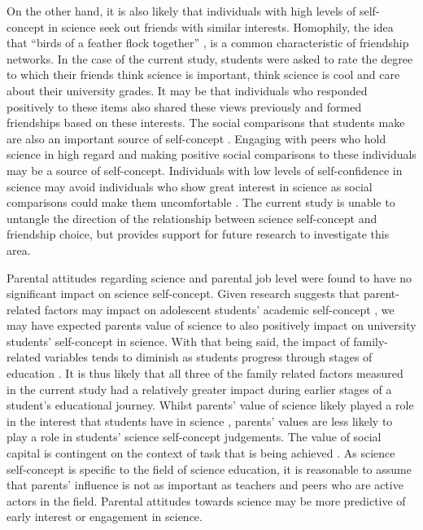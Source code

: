 On the other hand, it is also likely that individuals with high levels of self-concept in science seek out friends with similar interests. Homophily, the idea that ``birds of a feather flock together'' \cite{mcpherson2001birds}, is a common characteristic of friendship networks. In the case of the current study, students were asked to rate the degree to which their friends think science is important, think science is cool and care about their university grades. It may be that individuals who responded positively to these items also shared these views previously and formed friendships based on these interests. The social comparisons that students make are also an important source of self-concept \cite{butz2015salient}. Engaging with peers who hold science in high regard and making positive social comparisons to these individuals may be a source of self-concept. Individuals with low levels of self-confidence in science may avoid individuals who show great interest in science as social comparisons could make them uncomfortable \cite{bong1999comparison}. The current study is unable to untangle the direction of the relationship between science self-concept and friendship choice, but provides support for future research to investigate this area.   

Parental attitudes regarding science and parental job level were found to have no significant impact on science self-concept. Given research suggests that parent-related factors may impact on adolescent students' academic self-concept \cite{fan2010effects}, we may have expected parents value of science to also positively impact on university students' self-concept in science. With that being said, the impact of family-related variables tends to diminish as students progress through stages of education \cite{holm2011dealing}. It is thus likely that all three of the family related factors measured in the current study had a relatively greater impact during earlier stages of a student's educational journey. Whilst parents' value of science likely played a role in the interest that students have in science \cite{archer2013aspires}, parents' values are less likely to play a role in students' science self-concept judgements. The value of social capital is contingent on the context of task that is being achieved \cite{Adler2017}. As science self-concept is specific to the field of science education, it is reasonable to assume that parents' influence is not as important as teachers and peers who are active actors in the field. Parental attitudes towards science may be more predictive of early interest or engagement in science.  

